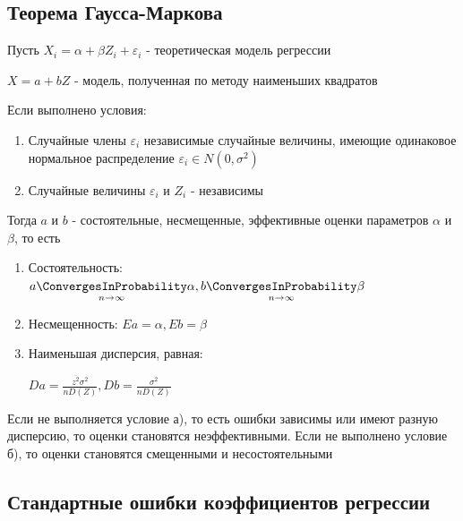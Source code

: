 \documentclass[12pt]{article}
\begin{document}
\subsection{Теорема Гаусса-Маркова}

\hypertarget{gauss_markov_theorem}{}

\begin{MyTheorem}
    \Ths Пусть $X_i = \alpha + \beta Z_i + \varepsilon_i$ - теоретическая модель регрессии

    $X = a + b Z$ - модель, полученная по методу наименьших квадратов

    Если выполнено условия:

    \begin{enumerate}[label=\asbuk*),ref=\asbuk*]
        \item Случайные члены $\varepsilon_i$ независимые случайные величины, имеющие одинаковое нормальное распределение $\varepsilon_i \in N(0, \sigma^2)$
        \item Случайные величины $\varepsilon_i$ и $Z_i$ - независимы
    \end{enumerate}

    Тогда $a$ и $b$ - состоятельные, несмещенные, эффективные оценки параметров $\alpha$ и $\beta$, то есть

    \begin{enumerate}
        \item Состоятельность: $a \underset{n \to \infty}{\ConvergesInProbability} \alpha, b \underset{n \to \infty}{\ConvergesInProbability} \beta$
        \item Несмещенность: $Ea = \alpha, Eb = \beta$
        \item Наименьшая дисперсия, равная:

        $D a = \frac{\overline{z^2} \sigma^2}{n D(Z)}, Db = \frac{\sigma^2}{n D(Z)}$
    \end{enumerate}
\end{MyTheorem}

\Nota Если не выполняется условие а), то есть ошибки зависимы или имеют разную дисперсию, то оценки становятся неэффективными. 
Если не выполнено условие б), то оценки становятся смещенными и несостоятельными

\subsection{Стандартные ошибки коэффициентов регрессии}

\hypertarget{regression_coefficient_error}{}
\end{document}

